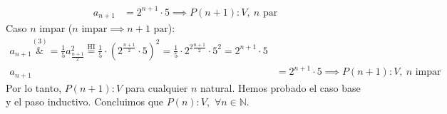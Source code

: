 \begin{enumerate}[label=\roman*)]
\begin{align*}
        a_{n+1} &= 2^{n+1} \cdot 5 \implies P(n+1):V,\ n \text{ par}
    \end{align*}
    Caso $n$ impar ($n \text{ impar} \implies n+1 \text{ par}$):
    \begin{align*}
        a_{n+1} \overset{(3)}&{=} \frac{1}{5} a_{\frac{n+1}{2}}^2 \overset{\text{HI}}{=} 
        \frac{1}{5} \cdot (2^{\frac{n+1}{2}}\cdot 5)^2 = \frac{1}{5} \cdot 2^{2\frac{n+1}{2}}\cdot 5^2 
        =2^{n+1} \cdot 5 \\
      a_{n+1} &= 2^{n+1} \cdot 5 \implies P(n+1):V,\ n \text{ impar}
  \end{align*}
    Por lo tanto, $P(n+1):V$ para cualquier $n$ natural.
    Hemos probado el caso base y el paso inductivo. Concluimos que $P(n):V,$ $\forall n \in \mathbb{N}$.
\end{enumerate}
